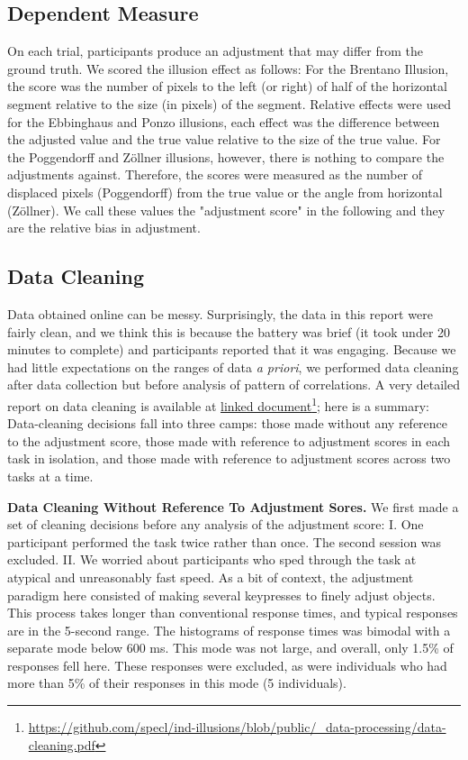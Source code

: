 
\subsection{Dependent Measure}

On each trial, participants produce an adjustment that may differ from the ground truth. We scored the illusion effect as follows: For the Brentano Illusion, the score was the number of pixels to the left (or right) of half of the horizontal segment relative to the size (in pixels) of the segment. Relative effects were used for the Ebbinghaus and Ponzo illusions, each effect was the difference between the adjusted value and the true value relative to the size of the true value. For the Poggendorff and Zöllner illusions, however, there is nothing to compare the adjustments against. Therefore, the scores were measured as the number of displaced pixels (Poggendorff) from the true value or the angle from horizontal (Zöllner).  We call these values the "adjustment score" in the following and they are the relative bias in adjustment.



\subsection{Data Cleaning}

Data obtained online can be messy.  Surprisingly, the data in this report were fairly clean, and we think this is because the battery was brief (it took under 20 minutes to complete) and participants reported that it was engaging.  Because we had little expectations on the ranges of data {\it a priori}, we performed data cleaning after data collection but before analysis of pattern of correlations.   A very detailed report on data cleaning is available at \href{https://github.com/specl/ind-illusions/blob/public/_data-processing/data-cleaning.pdf}{linked document}\footnote{\url{https://github.com/specl/ind-illusions/blob/public/_data-processing/data-cleaning.pdf}}; here is a summary: Data-cleaning decisions fall into three camps: those made without any reference to the adjustment score, those made with reference to adjustment scores in each task in isolation, and those made with reference to adjustment scores across two tasks at a time.  


{\bf Data Cleaning Without Reference To Adjustment Sores.} We first made a set of cleaning decisions before any analysis of the adjustment score:  I. One participant performed the task twice rather than once.  The second session was excluded.  II.  We worried about participants who sped through the task at atypical and unreasonably fast speed.  As a bit of context, the adjustment paradigm here consisted of making several keypresses to finely adjust objects. This process takes longer than conventional response times, and typical responses are in the 5-second range.  The histograms of response times was bimodal with a separate mode below 600 ms. This mode was not large, and overall, only 1.5\% of responses fell here. These responses were excluded, as were individuals who had more than 5\% of their responses in this mode (5 individuals). 

